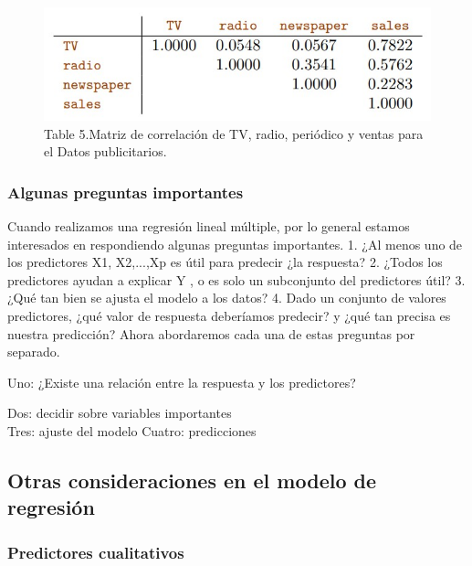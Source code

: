 \documentclass[
  letterpaper,
  DIV=11,
  numbers=noendperiod]{scrartcl}
\begin{document}
\begin{figure}

{\centering \includegraphics{images/sss.jpg}

}

\caption{Table 5.Matriz de correlación de TV, radio, periódico y ventas
para el Datos publicitarios.}

\end{figure}

\hypertarget{algunas-preguntas-importantes}{%
\subsubsection{Algunas preguntas
importantes}\label{algunas-preguntas-importantes}}

Cuando realizamos una regresión lineal múltiple, por lo general estamos
interesados \hspace{0pt}\hspace{0pt}en respondiendo algunas preguntas
importantes. 1. ¿Al menos uno de los predictores X1, X2,...,Xp es útil
para predecir ¿la respuesta? 2. ¿Todos los predictores ayudan a explicar
Y , o es solo un subconjunto del predictores útil? 3. ¿Qué tan bien se
ajusta el modelo a los datos? 4. Dado un conjunto de valores
predictores, ¿qué valor de respuesta deberíamos predecir? y ¿qué tan
precisa es nuestra predicción? Ahora abordaremos cada una de estas
preguntas por separado.

\hfill\break
Uno: ¿Existe una relación entre la respuesta y los predictores?

Dos: decidir sobre variables importantes\\
Tres: ajuste del modelo Cuatro: predicciones

\hypertarget{otras-consideraciones-en-el-modelo-de-regresiuxf3n}{%
\subsection{Otras consideraciones en el modelo de
regresión}\label{otras-consideraciones-en-el-modelo-de-regresiuxf3n}}

\hypertarget{predictores-cualitativos}{%
\subsubsection{Predictores
cualitativos}\label{predictores-cualitativos}}
\end{document}

